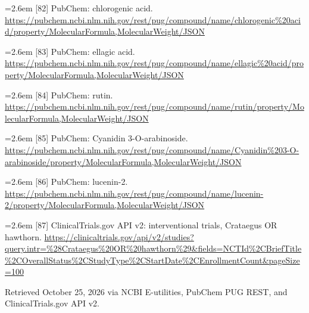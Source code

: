 \documentclass[11pt]{article}
\begin{document}
{\noindent\hangindent=2.6em [82] PubChem: chlorogenic acid. \url{https://pubchem.ncbi.nlm.nih.gov/rest/pug/compound/name/chlorogenic%20acid/property/MolecularFormula,MolecularWeight/JSON}\par
\noindent\hangindent=2.6em [83] PubChem: ellagic acid. \url{https://pubchem.ncbi.nlm.nih.gov/rest/pug/compound/name/ellagic%20acid/property/MolecularFormula,MolecularWeight/JSON}\par
\noindent\hangindent=2.6em [84] PubChem: rutin. \url{https://pubchem.ncbi.nlm.nih.gov/rest/pug/compound/name/rutin/property/MolecularFormula,MolecularWeight/JSON}\par
\noindent\hangindent=2.6em [85] PubChem: Cyanidin 3-O-arabinoside. \url{https://pubchem.ncbi.nlm.nih.gov/rest/pug/compound/name/Cyanidin%203-O-arabinoside/property/MolecularFormula,MolecularWeight/JSON}\par
\noindent\hangindent=2.6em [86] PubChem: lucenin-2. \url{https://pubchem.ncbi.nlm.nih.gov/rest/pug/compound/name/lucenin-2/property/MolecularFormula,MolecularWeight/JSON}\par
\noindent\hangindent=2.6em [87] ClinicalTrials.gov API v2: interventional trials, Crataegus OR hawthorn. \url{https://clinicaltrials.gov/api/v2/studies?query.intr=%28Crataegus%20OR%20hawthorn%29&fields=NCTId%2CBriefTitle%2COverallStatus%2CStudyType%2CStartDate%2CEnrollmentCount&pageSize=100}\par
\vspace{0.3em}\noindent Retrieved October 25, 2026 via NCBI E-utilities, PubChem PUG REST, and ClinicalTrials.gov API v2.}
\end{document}
